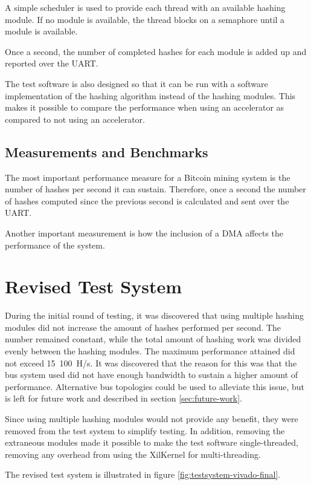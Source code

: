 A simple scheduler is used to provide each thread with an available hashing module.
If no module is available, the thread blocks on a semaphore until a module is available.

Once a second, the number of completed hashes for each module is added up and
reported over the UART.

The test software is also designed so that it can be run with a software implementation
of the hashing algorithm instead of the hashing modules. This makes it possible
to compare the performance when using an accelerator as compared to not using
an accelerator.

\subsection{Measurements and Benchmarks}
The most important performance measure for a Bitcoin mining system is the number
of hashes per second it can sustain. Therefore, once a second the number of hashes
computed since the previous second is calculated and sent over the UART.

Another important measurement is how the inclusion of a DMA affects the performance
of the system.

\section{Revised Test System}

During the initial round of testing, it was discovered that using multiple hashing
modules did not increase the amount of hashes performed per second. The number remained
constant, while the total amount of hashing work was divided evenly between
the hashing modules. The maximum performance attained did not exceed 15~100~H/s.
It was discovered that the reason for this was that the bus system used did not have
enough bandwidth to sustain a higher amount of performance. Alternative bus topologies
could be used to alleviate this issue, but is left for future work and described in
section \ref{sec:future-work}.

Since using multiple hashing modules would not provide any benefit, they were removed
from the test system to simplify testing. In addition, removing the extraneous modules
made it possible to make the test software single-threaded, removing any overhead from
using the XilKernel for multi-threading.

The revised test system is illustrated in figure \ref{fig:testsystem-vivado-final}.


